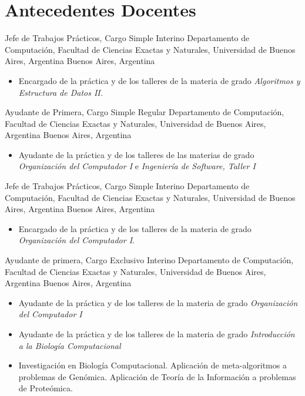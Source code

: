 \section{Antecedentes Docentes}

        {Jefe de Trabajos Prácticos, Cargo Simple Interino}
	{Departamento de Computación, Facultad de Ciencias Exactas y Naturales, Universidad de Buenos Aires, Argentina}
	{Buenos Aires, Argentina}
	{}
	{\begin{itemize}
	\item Encargado de la práctica y de los talleres de la materia de grado \emph{Algoritmos y Estructura de Datos II.}
	\end{itemize}}
	{Ayudante de Primera, Cargo Simple Regular}
	{Departamento de Computación, Facultad de Ciencias Exactas y Naturales, Universidad de Buenos Aires, Argentina}
	{Buenos Aires, Argentina}
	{}
	{\begin{itemize}
	\item Ayudante de la práctica y de los talleres de las materias de grado \emph{Organización del Computador I} e \emph{Ingeniería de Software, Taller I}
	\end{itemize}}
        {Jefe de Trabajos Prácticos, Cargo Simple Interino}
	{Departamento de Computación, Facultad de Ciencias Exactas y Naturales, Universidad de Buenos Aires, Argentina}
	{Buenos Aires, Argentina}
	{}
	{\begin{itemize}
	\item Encargado de la práctica y de los talleres de la materia de grado \emph{Organización del Computador I}.
	\end{itemize}}
	{Ayudante de primera, Cargo Exclusivo Interino}
	{Departamento de Computación, Facultad de Ciencias Exactas y Naturales, Universidad de Buenos Aires, Argentina}
	{Buenos Aires, Argentina}
	{}
	{\begin{itemize}
	\item Ayudante de la práctica y de los talleres de la materia de grado \emph{Organización del Computador I}
	\item Ayudante de la práctica y de los talleres de la materia de grado \emph{Introducción a la Biología Computacional}
	\item Investigación en Biología Computacional. Aplicación de meta-algoritmos a problemas de Genómica. Aplicación de Teoría de la Información a problemas de Proteómica.
	\end{itemize}}
